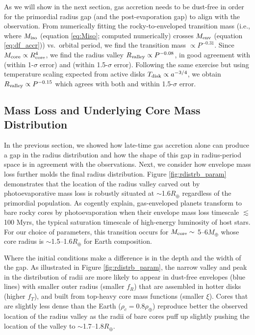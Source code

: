 \documentclass[twocolumn]{aastex63}
\begin{document}
As we will show in the next section, gas accretion needs to be dust-free in order for the primordial radius gap (and the post-evaporation gap) to align with the observation. From numerically fitting the rocky-to-enveloped transition mass (i.e., where $M_{\rm iso}$ (equation \ref{eq:Miso}; computed numerically) crosses $M_{\rm env}$ (equation \ref{eq:df_accr})) vs.~orbital period, we find the transition mass $\propto P^{-0.31}$. Since $M_{\rm core} \propto R_{\rm core}^4$, we find the radius valley $R_{\rm valley} \propto P^{-0.08}$, in good agreement with \citet{vanEylen18} (within 1-$\sigma$ error) and \citet{Martinez19} (within 1.5-$\sigma$ error). Following the same exercise but using temperature scaling expected from active disks $T_{\rm disk} \propto a^{-3/4}$, we obtain $R_{\rm valley} \propto P^{-0.15}$ which agrees with both \citet{vanEylen18} and \citet{Martinez19} within 1.5-$\sigma$ error.

\subsection{Mass Loss and Underlying Core Mass Distribution}
\label{ssec:mass_loss}

In the previous section, we showed how late-time gas accretion alone can produce a gap in the radius distribution and how the shape of this gap in radius-period space is in agreement with the observations.
Next, we consider how envelope mass loss further molds the final radius distribution.
Figure \ref{fig:rdistrb_param} demonstrates that the location of the radius valley carved out by photoevaporative mass loss is robustly situated at $\sim$1.6$R_\oplus$ regardless of the primordial population. As \citet{Owen17} cogently explain, gas-enveloped planets transform to bare rocky cores by photoevaporation when their envelope mass loss timescale $\lesssim$100 Myrs, the typical saturation timescale of high-energy luminosity of host stars. For our choice of parameters, this transition occurs for $M_{\rm core} \sim$ 5--6$M_\oplus$ whose core radius is $\sim$1.5--1.6$R_\oplus$ for Earth composition.

Where the initial conditions make a difference is in the depth and the width of the gap. As illustrated in Figure \ref{fig:rdistrb_param}, the narrow valley and peak in the distribution of radii are more likely to appear in dust-free envelopes (blue lines) with smaller outer radius (smaller $f_R$) that are assembled in hotter disks (higher $f_T$), and built from top-heavy core mass functions (smaller $\xi$). Cores that are slightly less dense than the Earth ($\rho_c = 0.8\rho_\oplus$) reproduce better the observed location of the radius valley as the radii of bare cores puff up slightly pushing the location of the valley to $\sim$1.7--1.8$R_\oplus$.
\end{document}
